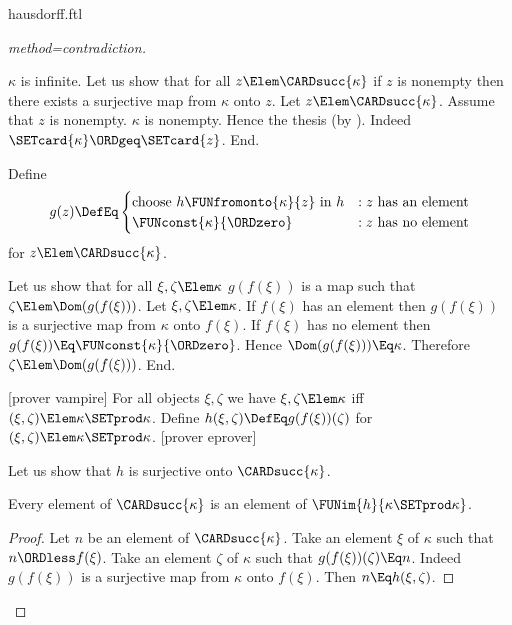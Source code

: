 \documentclass{stex}
\begin{document}
\begin{smodule}{hausdorff.ftl}
\begin{forthel}
\begin{proof}[method=contradiction]
\begin{case}{$\kappa$ is infinite.}
      Let us show that for all $z \Elem \CARDsucc{\kappa}$ if $z$ is nonempty then there exists a surjective map from $\kappa$ onto $z$.
        Let $z \Elem \CARDsucc{\kappa}$.
        Assume that $z$ is nonempty.
        $\kappa$ is nonempty.
        Hence the thesis (by ).
        Indeed $\SETcard{\kappa} \ORDgeq \SETcard{z}$.
      End.
  
      Define \[ g(z) \DefEq
        \begin{cases}
          \text{choose $h \FUNfromonto{\kappa}{z}$ in $h$}
          & : \text{$z$ has an element}
          \\
          \text{$\FUNconst{\kappa}{\ORDzero}$}
          & : \text{$z$ has no element}
        \end{cases}
      \] for $z \Elem \CARDsucc{\kappa}$.
  
      Let us show that for all $\xi, \zeta \Elem \kappa$ $g(f(\xi))$ is a map such that $\zeta \Elem\linebreak \Dom(g(f(\xi)))$.
        Let $\xi, \zeta \Elem \kappa$.
        If $f(\xi)$ has an element then $g(f(\xi))$ is a surjective map from $\kappa$ onto $f(\xi)$.
        If $f(\xi)$ has no element then $g(f(\xi)) \Eq\linebreak \FUNconst{\kappa}{\ORDzero}$.
        Hence $\Dom(g(f(\xi))) \Eq \kappa$.
        Therefore $\zeta \Elem \Dom(g(f(\xi)))$.
      End.
  
      [prover vampire]
      For all objects $\xi, \zeta$ we have $\xi, \zeta \Elem \kappa$ iff $(\xi, \zeta) \Elem \kappa \SETprod \kappa$.
      Define $h(\xi,\zeta) \DefEq g(f(\xi))(\zeta)$ for $(\xi,\zeta) \Elem \kappa \SETprod \kappa$.
      [prover eprover]

      Let us show that $h$ is surjective onto $\CARDsucc{\kappa}$.
  
        Every element of $\CARDsucc{\kappa}$ is an element of $\FUNim{h}{\kappa \SETprod \kappa}$.
        \begin{proof}
          Let $n$ be an element of $\CARDsucc{\kappa}$.
          Take an element $\xi$ of $\kappa$ such that $n \ORDless f(\xi)$.
          Take an element $\zeta$ of $\kappa$ such that $g(f(\xi))(\zeta) \Eq n$.
          Indeed $g(f(\xi))$ is a surjective map from $\kappa$ onto $f(\xi)$.
          Then $n \Eq h(\xi,\zeta)$.
        \end{proof}
  

\end{case}
\end{proof}
\end{forthel}
\end{smodule}
\end{document}
